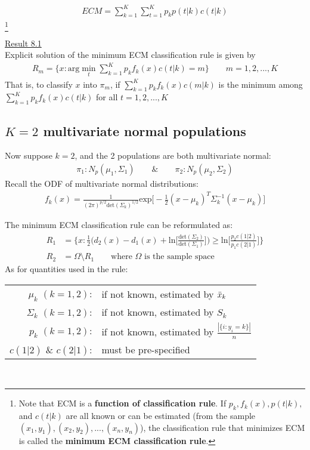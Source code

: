 \documentclass[12pt]{extarticle}
\newcommand{\<}{\langle}
\renewcommand{\>}{\rangle}
\theoremstyle{definition}
\begin{document}
\newpage
\begin{tcolorbox}[enhanced, drop fuzzy shadow, title=ECM: Expected Cost of Missclassification]
\begin{align*}
    ECM=\sum^K_{k=1}\sum^K_{t=1} p_k p(t|k) c(t|k)
\end{align*}
\footnote{Note that ECM is a \textbf{function of classification rule}. If $p_k, f_k(x), p(t|k),$ and $c(t|k)$ are all known or can be estimated (from the sample $(x_1, y_1),(x_2, y_2),...,(x_n, y_n)$), the classification rule that minimizes ECM is called the \textbf{minimum ECM classification rule}.}
\end{tcolorbox}
\underline{Result 8.1}\\
Explicit solution of the minimum ECM classification rule is given by
\begin{align*}
    R_m = \{x: \text{arg}\min_t \sum^K_{k=1}p_k f_k(x) c(t|k) =m \} \qquad m=1,2,...,K
\end{align*}
That is, to classify $x$ into $\pi_m$, if $\sum^K_{k=1}p_k f_k(x) c(m|k)$ is the minimum among $\sum^K_{k=1}p_k f_k(x) c(t|k)$ for all $t=1,2,...,K$

\subsection{$K=2$ multivariate normal populations}
Now suppose $k=2$, and the 2 populations are both multivariate normal:
\begin{align*}
    \pi_1: N_p(\mu_1,\Sigma_1) \qquad \& \qquad \pi_2: N_p(\mu_2,\Sigma_2)
\end{align*}
Recall the ODF of multivariate normal distributions:
\begin{align*}
    f_k(x) = \frac{1}{(2\pi)^{p/2} \text{det}(\Sigma_k)^{1/2}} \text{exp}\bigg[-\frac{1}{2}(x-\mu_k)^T\Sigma^{-1}_k (x-\mu_k) \bigg]
\end{align*}

The minimum ECM classification rule can be reformulated as:
\begin{align*}
    R_1 &= \Bigg\{x:\frac{1}{2}\bigg( d_2(x)-d_1(x) +\text{ln}\bigg[ \frac{\text{det}(\Sigma_2)}{\text{det}(\Sigma_1)}\bigg]\bigg) \geq \text{ln}\bigg[\frac{p_2 c(1|2)}{p_1 c(2|1)}\bigg] \Bigg\} \\
    R_2 &= \Omega \setminus R_1 \qquad \text{where $\Omega$ is the sample space}
\end{align*}
As for quantities used in the rule:\\
\begin{tabular}{rl}
$\mu_k$ $(k=1,2)$:& if not known, estimated by $\Bar{x}_k$\\
$\Sigma_k$ $(k=1,2)$:& if not known, estimated by $S_k$\\
$p_k$ $(k=1,2)$:& if not known, estimated by $\frac{|\{i:y_i =k\}|}{n}$\\
$c(1|2)$ \& $c(2|1)$:& must be pre-specified
\end{tabular}\\
\end{document}
